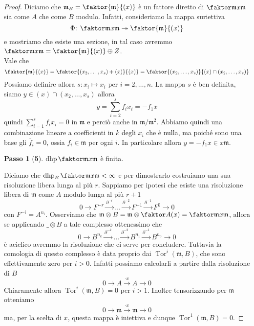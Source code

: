 \documentclass[a4paper,11pt,oneside]{book}
\newcommand{\m}{\mathfrak{m}}
\DeclareMathOperator{\Tor}{Tor}
\DeclareMathOperator{\dhp}{dhp}
\theoremstyle{definition}
\newtheorem*{passo}{Passo}
\begin{document}
\begin{proof}
              Diciamo che $\m_B=\faktor {\m} {(x)} $ è un fattore diretto di $\faktor \m {x\m}$ sia come 
              $A$ che come $B$ modulo. Infatti,
                consideriamo la mappa  suriettiva
	      \[
	       \Phi\colon \faktor \m {x\m}\twoheadrightarrow \faktor {\m} {(x)} 
	      \]
	      e mostriamo che esiste una sezione, in tal caso avremmo  $\faktor \m {x\m}= \faktor {\m} {(x)} \oplus Z$.\\
	      Vale che
	      \[
	       \faktor {\m} {(x)}= \faktor {(x_2,\dots, x_s)+(x)} {(x)} =\faktor{(x_2,\dots, x_s)}{(x)\cap (x_2,\dots, x_s)}
	      \]
	      Possiamo definire allora $s\colon x_i\mapsto x_i$ per $i=2,\dots, n$. La mappa $s$ è ben definita, siamo
	      $y\in(x)\cap (x_2,\dots, x_s)$ allora 
	      \[
	       y=\sum_{i=2}^sf_ix_i=-f_1x
	      \]
	      quindi $\sum_{i=1}^sf_ix_i=0$ in $\m$ e perciò anche in $\m/\m^2$. Abbiamo quindi una combinazione lineare a coefficienti
	      in $k$ degli $x_i$ che è nulla, ma poiché sono una base gli $\bar f_i=0$, ossia $f_i\in\m$ per ogni $i$. In particolare
	      allora $y=-f_1x\in x\m$. 	      
			\begin{flushright}
	                 \checkmark
	                \end{flushright}
	      
	      \begin{passo}[\textbf{5}]
	       $\dhp\faktor \m {x\m}$ è finita.
	      \end{passo}
         
	      Diciamo che $\dhp_B\faktor \m {x\m}<\infty$ e per dimostrarlo costruiamo una sua risoluzione libera lunga al più $r$.
	      Sappiamo per ipotesi che esiste una risoluzione libera di $\m$ come $A$ modulo lunga al più $r+1$
	      \[
	      0\rightarrow F^{-r}\xrightarrow{\partial^{-r}}\dots\xrightarrow{\partial^{-2}} F^{-1}\xrightarrow{\partial^{-1}}F^0\rightarrow 0
	      \]
	      con $F^{-i}=A^{n_i}$. Osserviamo che $\m \otimes B =\m\otimes\faktor A {(x)} = \faktor \m {x\m}$, allora se applicando 
	      $\_\otimes B$ a tale complesso ottenessimo che    
	      \[
	      0\rightarrow B^{n_k}\xrightarrow{\partial^{-k}}\dots\xrightarrow{\partial^{-2}} B^{n_1}\xrightarrow{\partial^{-1}}B^{n_0}\rightarrow 0
	      \]
	      è aciclico avremmo la risoluzione che ci serve per concludere. Tuttavia la comologia di questo complesso è 
	      data proprio dai $\Tor^i(\m,B)$, che sono effettivamente zero per $i>0$. Infatti possiamo calcolarli a partire dalla risoluzione di $B$
	      \[
	       0\rightarrow A\xrightarrow{\cdot x} A\rightarrow 0
	      \]
	      Chiaramente allora $\Tor^i(\m,B)=0$ per $i>1$. Inoltre tensorizzando per $\m$ otteniamo
	      \[
	       0\rightarrow \m\xrightarrow{\cdot x} \m\rightarrow 0
	      \]
	      ma, per la scelta di $x$, questa mappa è iniettiva e dunque $\Tor^1(\m,B)=0$.
     \end{proof}
\end{document}
